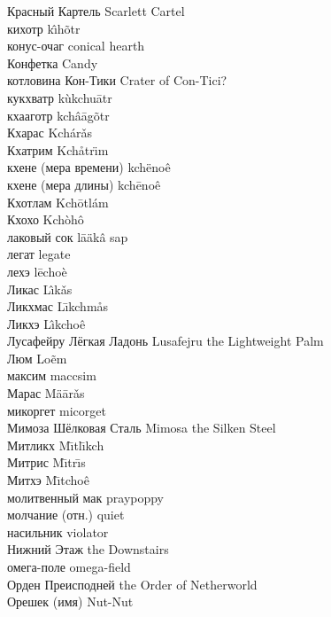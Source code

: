 \documentclass[a4paper,10pt]{book}
\begin{document}
Красный Картель \hfill Scarlett Cartel\\
кихотр \hfill k\^{\i}h\~{o}tr\\
конус-очаг \hfill conical hearth\\
Конфетка \hfill Candy\\
котловина Кон-Тики \hfill Crater of Con-Tici?\\
кукхватр \hfill k\`{u}kchu\={a}tr\\
кхааготр \hfill kch\^{a}\={a}g\~{o}tr\\
Кхарас \hfill Kch\'{a}r\v{a}s\\
Кхатрим \hfill Kch\r{a}tr\"{\i}m\\
кхене (мера времени) \hfill kch\"{e}no\^{e}\\
кхене (мера длины) \hfill kch\={e}no\^{e}\\
Кхотлам \hfill Kch\={o}tl\'{a}m\\
Кхохо \hfill Kch\`{o}h\^{o}\\
лаковый сок \hfill l\={a}\"{a}k\^{a} sap\\
легат \hfill legate\\
лехэ \hfill l\={e}cho\`{e}\\
Ликас \hfill L\^{\i}k\v{a}s\\
Ликхмас \hfill L\={\i}kchm\r{a}s\\
Ликхэ \hfill L\^{\i}kcho\^{e}\\
Лусафейру Лёгкая Ладонь \hfill Lusafejru the Lightweight Palm\\
Люм \hfill Lo\~{e}m\\
максим \hfill maccsim\\
Марас \hfill M\"{a}\={a}r\v{a}s\\
микоргет \hfill micorget\\
Мимоза Шёлковая Сталь \hfill Mimosa the Silken Steel\\
Митликх \hfill M\={\i}tl\={\i}kch\\
Митрис \hfill M\={\i}tr\={\i}s\\
Митхэ \hfill M\={\i}tcho\^{e}\\
молитвенный мак \hfill praypoppy\\
молчание (отн.) \hfill quiet\\
насильник \hfill violator\\
Нижний Этаж \hfill the Downstairs\\
омега-поле \hfill omega-field\\
Орден Преисподней \hfill the Order of Netherworld\\
Орешек (имя) \hfill Nut-Nut\\
\end{document}
